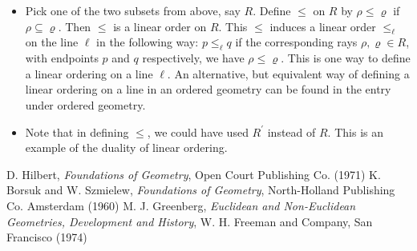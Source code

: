 \documentclass[12pt]{article}
\begin{document}
\begin{itemize}
\item Pick one of the two subsets from above, say $R$.  Define $\le$ on $R$ by $\rho\le\varrho$ if $\rho\subseteq\varrho$.  Then $\le$ is a linear order on $R$.  This $\le$ induces a linear order $\le_{\ell}$ on the line $\ell$ in the following way: $p\le_{\ell}q$ if the corresponding rays $\rho,\varrho\in R$, with endpoints $p$
and $q$ respectively, we have $\rho\le\varrho$.  This is one way to define a linear ordering on a line $\ell$.  An alternative, but equivalent way of defining a linear ordering on a line in an ordered geometry can be found in the entry under ordered geometry.
\item Note that in defining $\le$, we could have used $R^{\prime}$ instead of $R$.  This is an example of the duality of linear ordering.
\end{itemize}

\begin{thebibliography}{6}
 D. Hilbert, {\it Foundations of Geometry}, Open Court Publishing Co. (1971)
 K. Borsuk and W. Szmielew, {\it Foundations of Geometry}, North-Holland Publishing Co. Amsterdam (1960)
 M. J. Greenberg, {\it Euclidean and Non-Euclidean Geometries, Development and History}, W. H. Freeman and Company, San Francisco (1974)
\end{thebibliography}
\end{document}

